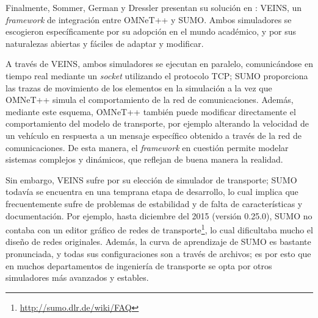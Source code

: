 Finalmente, Sommer, German y Dressler presentan su solución en \autocite{sommer_german_dressler}: VEINS, un \textit{framework} de integración entre OMNeT++ y SUMO. Ambos simuladores se escogieron específicamente por su adopción en el mundo académico, y por sus naturalezas abiertas y fáciles de adaptar y modificar.

A través de VEINS, ambos simuladores se ejecutan en paralelo, comunicándose en tiempo real mediante un \textit{socket} utilizando el protocolo TCP; SUMO proporciona las trazas de movimiento de los elementos en la simulación a la vez que OMNeT++ simula el comportamiento de la red de comunicaciones. Además, mediante este esquema, OMNeT++ también puede modificar directamente el comportamiento del modelo de transporte, por ejemplo alterando la velocidad de un vehículo en respuesta a un mensaje específico obtenido a través de la red de comunicaciones. De esta manera, el \textit{framework} en cuestión permite modelar sistemas complejos y dinámicos, que reflejan de buena manera la realidad.

Sin embargo, VEINS sufre por su elección de simulador de transporte; SUMO todavía se encuentra en una temprana etapa de desarrollo, lo cual implica que frecuentemente sufre de problemas de estabilidad y de falta de características y documentación. Por ejemplo, hasta diciembre del 2015 (versión 0.25.0), SUMO no contaba con un editor gráfico de redes de transporte\footnote{\url{http://sumo.dlr.de/wiki/FAQ}}, lo cual dificultaba mucho el diseño de redes originales. Además, la curva de aprendizaje de SUMO es bastante pronunciada, y todas sus configuraciones son a través de archivos; es por esto que en muchos departamentos de ingeniería de transporte se opta por otros simuladores más avanzados y estables. 


